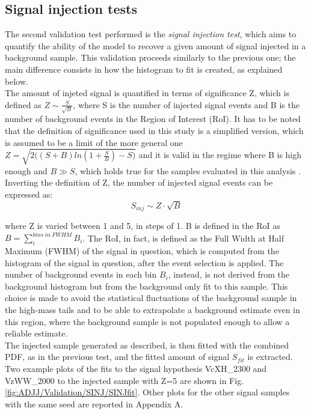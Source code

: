\subsection{Signal injection tests}\label{sec:ADJJ/Validation/SINJ}

The second validation test performed is the \textit{signal injection test}, which aims to quantify the ability of the model to recover a given amount of signal injected in a background sample.
This validation proceeds similarly to the previous one; the main difference consists in how the histogram to fit is created, as explained below.\\
The amount of injeted signal is quantified in terms of significance Z, which is defined as $Z \sim \frac{S}{\sqrt{B}}$, where S is the number of injected signal events and B is the number of background events in the Region of Interest (RoI).
It has to be noted that the definition of significance used in this study is a simplified version, which is assumed to be a limit of the more general one $Z=\sqrt{2\Big((S+B)ln(1+\frac{S}{B})-S\Big)}$ and it is valid in the regime where B is high enough and $B\gg S$, which holds true for the samples evaluated in this analysis \cite{Lik_tests}.
Inverting the definition of Z, the number of injected signal events can be expressed as:
\begin{equation}
  S_{inj} \sim Z \cdot \sqrt{B}
\end{equation}

\noindent where Z is varied between 1 and 5, in steps of 1.
B is defined in the RoI as $B=\sum_{i}^{bins~in~ FWHM}B_i$. 
The RoI, in fact, is defined as the Full Width at Half Maximum (FWHM) of the signal in question, which is computed from the histogram of the signal in question, after the event selection is applied.
The number of background events in each bin $B_i$, instead, is not derived from the background histogram but from the background only fit to this sample.
This choice is made to avoid the statistical fluctuations of the background sample in the high-mass tails and to be able to extrapolate a background estimate even in this region, where the background sample is not populated enough to allow a reliable estimate.\\
The injected sample generated as described, is then fitted with the combined PDF, as in the previous test, and the fitted amount of signal $S_{fit}$ is extracted.
Two example plots of the fits to the signal hypothesis VcXH\_2300 and VzWW\_2000 to the injected sample with Z=5 are shown in Fig. \ref{fig:ADJJ/Validation/SINJ/SINJfit}.
Other plots for the other signal samples with the same seed are reported in Appendix A.

